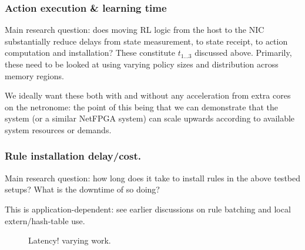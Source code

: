 \documentclass[sigconf,natbib=false]{acmart}
\begin{document}
\begin{appendices}
	\subsubsection{Action execution \& learning time}
	Main research question: does moving RL logic from the host to the NIC substantially reduce delays from state measurement, to state receipt, to action computation and installation?
	These constitute $t_{1...3}$ discussed above.
	Primarily, these need to be looked at using varying policy sizes and distribution across memory regions.
	
	We ideally want these both with and without any acceleration from extra cores on the netronome: the point of this being that we can demonstrate that the system (or a similar NetFPGA system) can scale upwards according to available system resources or demands.
	
	\subsubsection{Rule installation delay/cost.}
	Main research question: how long does it take to install rules in the above testbed setups? What is the downtime of so doing?
	
	This is application-dependent: see earlier discussions on rule batching and local extern/hash-table use.
	
	\begin{figure}
		\caption{Latency! varying work.\label{fig:vary-work-latency}}
	\end{figure}
	

\end{appendices}
\end{document}
